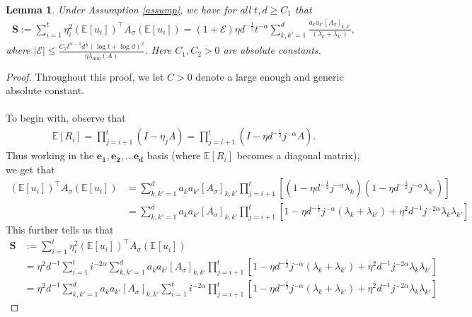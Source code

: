 \documentclass[11pt, reqno,english]{amsart}
\newtheorem{lemma}{Lemma}[section]
\begin{document}
\begin{lemma}\label{variance-simplification}
Under Assumption \ref{assump}, we have for all $t,d \geq C_1$ that
\begin{align*}
\mathbf{S}:= \sum_{i = 1}^t \eta_i^2 (\mathbb{E}[u_i])^\top  A_{\sigma} (\mathbb{E}[u_i]) = (1 + \mathcal E)\eta d^{-\frac{1}{2}}t^{-\alpha}\sum_{k,k' = 1}^d \frac{a_{k}a_{k'}[A_{\sigma}]_{k,k'}}{(\lambda_k + \lambda_{k'})},
\end{align*}
where $|\mathcal E| \leq \frac{C_2 t^{\alpha - 1}d^{\frac{1}{2}}(\log t + \log d)^2}{\eta \lambda_{\min}(A)}$. Here $C_1, C_2 > 0$ are absolute constants. 
\end{lemma}
\begin{proof} 
Throughout this proof, we let $C > 0$ denote a large enough and generic absolute constant.
\\\\
To begin with, observe that
\begin{align*}
    \mathbb{E}[R_i] = \prod_{j = i+1}^{t}(I - \eta_{j}A) = \prod_{j = i+1}^{t}(I - \eta d^{-\frac{1}{2}}j^{-\alpha}A).
\end{align*}
Thus working in the $\mathbf{e_1}, \mathbf{e_2}, \dots \mathbf{e_d}$ basis (where  $\mathbb{E}[R_i]$ becomes a diagonal matrix), we get that
\begin{align*}
(\mathbb{E}[u_i])^\top A_{\sigma} (\mathbb{E}[u_i]) &= \sum_{k,k' = 1}^d a_k a_{k'} [ A_{\sigma}]_{k,k'} \prod_{j = i+1}^t[(1 - \eta d^{-\frac{1}{2}}j^{-\alpha}\lambda_{k})(1 - \eta d^{-\frac{1}{2}}j^{-\alpha}\lambda_{k'})]
\\
&= \sum_{k,k' = 1}^d a_k a_{k'} [A_{\sigma}]_{k,k'} \prod_{j = i+1}^t[1 - \eta d^{-\frac{1}{2}}j^{-\alpha}(\lambda_k + \lambda_{k'}) + \eta^2 d^{-1} j^{-2\alpha} \lambda_k \lambda_{k'}]
\end{align*}
This further tells us that
\begin{align*}
\mathbf{S} &:= \sum_{i = 1}^t \eta_i^2 (\mathbb{E}[u_i])^\top  A_{\sigma} (\mathbb{E}[u_i])
\\
&=\eta^2d^{-1}\sum_{i = 1}^t i^{-2\alpha}\sum_{k,k' = 1}^d a_k a_{k'}[A_{\sigma}]_{k,k'} \prod_{j=i+1}^t[1 - \eta d^{-\frac{1}{2}} j^{-\alpha} (\lambda_k + \lambda_{k'}) + \eta^2 d^{-1} j^{-2\alpha} \lambda_{k} \lambda_{k'}]
\\
&= \eta^2d^{-1}\sum_{k,k' = 1}^d a_k a_{k'}[A_{\sigma}]_{k,k'} \sum_{i = 1}^ti^{-2\alpha}\prod_{j=i+1}^t[1 - \eta d^{-\frac{1}{2}} j^{-\alpha} (\lambda_k + \lambda_{k'}) + \eta^2 d^{-1} j^{-2\alpha} \lambda_{k} \lambda_{k'}]
\end{align*}

\end{proof}
\end{document}
